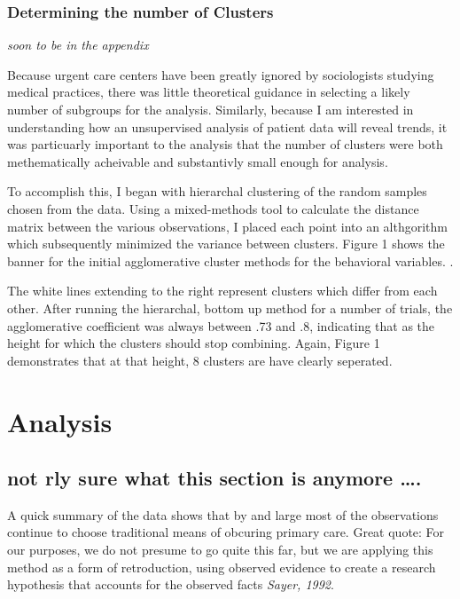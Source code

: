 \documentclass[12pt,twoside]{reedthesis}
\begin{document}
  \subsection{Determining the number of
  Clusters}\label{determining-the-number-of-clusters}
  
  \emph{soon to be in the appendix}
  
  Because urgent care centers have been greatly ignored by sociologists
  studying medical practices, there was little theoretical guidance in
  selecting a likely number of subgroups for the analysis. Similarly,
  because I am interested in understanding how an unsupervised analysis of
  patient data will reveal trends, it was particuarly important to the
  analysis that the number of clusters were both methematically acheivable
  and substantivly small enough for analysis.
  
  To accomplish this, I began with hierarchal clustering of the random
  samples chosen from the data. Using a mixed-methods tool to calculate
  the distance matrix between the various observations, I placed each
  point into an althgorithm which subsequently minimized the variance
  between clusters. Figure 1 shows the banner for the initial
  agglomerative cluster methods for the behavioral variables. .
  
  The white lines extending to the right represent clusters which differ
  from each other. After running the hierarchal, bottom up method for a
  number of trials, the agglomerative coefficient was always between .73
  and .8, indicating that as the height for which the clusters should stop
  combining. Again, Figure 1 demonstrates that at that height, 8 clusters
  are have clearly seperated.
  
  \chapter{Analysis}\label{analysis}
  
  \onehalfspacing
  
  \section{not rly sure what this section is anymore
  \ldots{}.}\label{not-rly-sure-what-this-section-is-anymore-.}
  
  A quick summary of the data shows that by and large most of the
  observations continue to choose traditional means of obcuring primary
  care. Great quote: For our purposes, we do not presume to go quite this
  far, but we are applying this method as a form of retroduction, using
  observed evidence to create a research hypothesis that accounts for the
  observed facts \emph{Sayer, 1992}.
  
\end{document}
